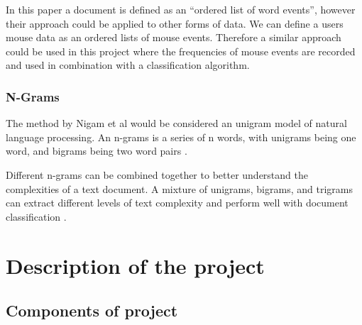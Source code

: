 \documentclass{article}
\begin{document}
In this paper a document is defined as an ``ordered list of word events'', however their approach could be applied to other forms of data.
We can define a users mouse data as an ordered lists of mouse events.
Therefore a similar approach could be used in this project where the frequencies of mouse events are recorded and used in combination with a classification algorithm.

\subsubsection{N-Grams}

The method by Nigam et al would be considered an unigram model of natural language processing.
An n-grams is a series of n words, with unigrams being one word, and bigrams being two word pairs \cite{keselj2009speech}.

Different n-grams can be combined together to better understand the complexities of a text document.
A mixture of unigrams, bigrams, and trigrams can extract different levels of text complexity and perform well with document classification \cite{aggarwal2012survey}.





\section{Description of the project}

\subsection{Components of project}
\end{document}
